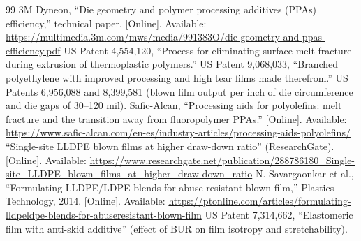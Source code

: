 \documentclass[conference,a4paper]{IEEEtran}
\begin{document}
\begin{thebibliography}{99}
 3M Dyneon, “Die geometry and polymer processing additives (PPAs) efficiency,” technical paper. [Online]. Available: \url{https://multimedia.3m.com/mws/media/991383O/die-geometry-and-ppas-efficiency.pdf}
 US Patent 4,554,120, “Process for eliminating surface melt fracture during extrusion of thermoplastic polymers.”
 US Patent 9,068,033, “Branched polyethylene with improved processing and high tear films made therefrom.”
 US Patents 6,956,088 and 8,399,581 (blown film output per inch of die circumference and die gaps of 30–120 mil).
 Safic-Alcan, “Processing aids for polyolefins: melt fracture and the transition away from fluoropolymer PPAs.” [Online]. Available: \url{https://www.safic-alcan.com/en-es/industry-articles/processing-aids-polyolefins/}
 “Single-site LLDPE blown films at higher draw-down ratio” (ResearchGate). [Online]. Available: \url{https://www.researchgate.net/publication/288786180_Single-site_LLDPE_blown_films_at_higher_draw-down_ratio}
 N. Savargaonkar et al., “Formulating LLDPE/LDPE blends for abuse-resistant blown film,” Plastics Technology, 2014. [Online]. Available: \url{https://ptonline.com/articles/formulating-lldpeldpe-blends-for-abuseresistant-blown-film}
 US Patent 7,314,662, “Elastomeric film with anti-skid additive” (effect of BUR on film isotropy and stretchability).
\end{thebibliography}
\end{document}

